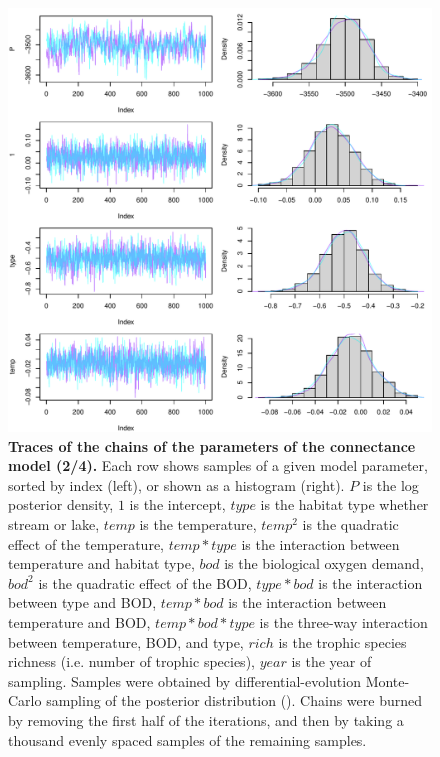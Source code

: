 \documentclass[11pt, oneside]{article}
\begin{document}
\begin{figure}[H]
\begin{center}
\includegraphics[page=2, width=1\linewidth]{b0_6_2/out_con/fig_tracePlot_beta.pdf}
\caption{
    \textbf{Traces of the chains of the parameters of the connectance model (2/4).}
    Each row shows samples of a given model parameter, sorted by index (left), or shown as a histogram (right).
    $P$ is the log posterior density, $1$ is the intercept, $type$ is the habitat type whether stream or lake, $temp$ is the temperature, $temp^2$ is the quadratic effect of the temperature, $temp * type$ is the interaction between temperature and habitat type, $bod$ is the biological oxygen demand, $bod^2$ is the quadratic effect of the BOD, $type * bod$ is the interaction between type and BOD, $temp * bod$ is the interaction between temperature and BOD, $temp * bod * type$ is the three-way interaction between temperature, BOD, and type, $rich$ is the trophic species richness (i.e. number of trophic species), $year$ is the year of sampling.
    Samples were obtained by differential-evolution Monte-Carlo sampling of the posterior distribution (\cite{TerBraak2006}).
    Chains were burned by removing the first half of the iterations, and then by taking a thousand evenly spaced samples of the remaining samples.
}
\end{center}
\end{figure}
\end{document}
